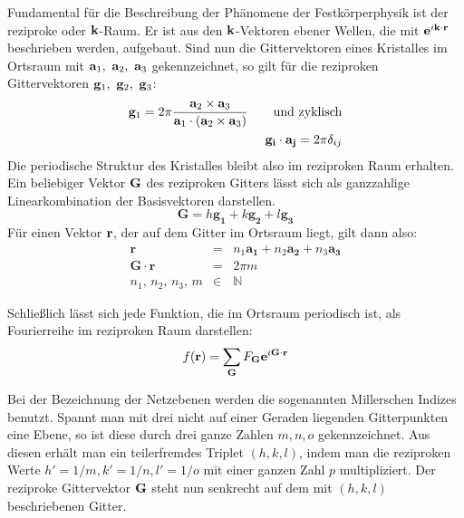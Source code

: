 Fundamental für die Beschreibung der Phänomene der Festkörperphysik ist der reziproke 
oder $\mathbf{k}$-Raum. Er ist aus den $\mathbf{k}$-Vektoren ebener Wellen, die mit 
$\mathbf{e}^{i \mathbf{k} \cdot \mathbf{r}}$ beschrieben werden, aufgebaut. Sind nun 
die Gittervektoren eines Kristalles im Ortsraum mit $\A_1,\ \A_2,\ \A_3$ gekennzeichnet, 
so gilt für die reziproken Gittervektoren $\mathbf{g}_1,\ \mathbf{g}_2,\ \mathbf{g}_3$:
\begin{eqnarray}
    \mathbf{g}_1 = 2 \pi \frac{\mathbf{a}_2 \times \mathbf{a}_3 }
        {\mathbf{a}_1\cdot (\mathbf{a}_2 \times \mathbf{a}_3)} \qquad \mathrm{und \ zyklisch} \\
    \mathbf{g_i} \cdot \mathbf{a_j} = 2 \pi \delta_{ij}
\end{eqnarray}
Die periodische Struktur des Kristalles bleibt also im reziproken Raum erhalten.
Ein beliebiger Vektor $\mathbf{G}$ des reziproken Gitters lässt sich als ganzzahlige Linearkombination 
der Basisvektoren darstellen.
\begin{equation}
    \mathbf{G} = h \mathbf{g_1} + k \mathbf{g_2} + l \mathbf{g_3}
\end{equation}
Für einen Vektor $\mathbf{r}$, der auf dem Gitter im Ortsraum liegt, gilt dann also:
\begin{eqnarray}
    \mathbf{r} &=& n_1 \mathbf{a_1} + n_2 \mathbf{a_2} + n_3 \mathbf{a_3} \\
    \mathbf{G} \cdot \mathbf{r}&=& 2 \pi m  \\
    n_1, \, n_2, \, n_3, \, m &\in& \mathbb{N}
\end{eqnarray}

Schließlich lässt sich jede Funktion, die im Ortsraum periodisch ist, als 
Fourierreihe im reziproken Raum darstellen:
\begin{equation}
    f(\mathbf{r}) = \sum_{\mathbf{G}} F_{\mathbf{G}} \mathbf{e}^{i \mathbf{G} \cdot \mathbf{r}}
\end{equation}

Bei der Bezeichnung der Netzebenen werden die sogenannten Millerschen Indizes benutzt. 
Spannt man mit drei nicht auf einer Geraden liegenden Gitterpunkten eine Ebene, so ist 
diese durch 
drei ganze Zahlen $m, n, o$ gekennzeichnet. Aus diesen erhält man ein teilerfremdes 
Triplet $(h, k, l)$, indem man die reziproken Werte $h' = 1/m, k' = 1/n, l' = 1/o$ mit 
einer ganzen Zahl $p$ multipliziert. Der reziproke 
Gittervektor $\mathbf{G}$ steht nun senkrecht auf dem mit $(h, k, l)$ beschriebenen Gitter.
\cite{ibach2009festkorperphysik}





